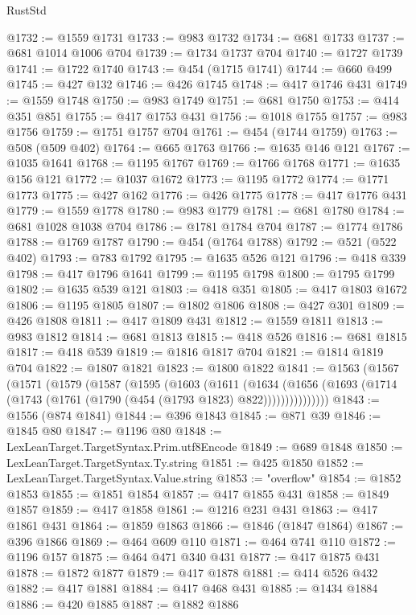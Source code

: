 \begin{lexlean}{RustStd}
\begin{coremodule}
@1732 := @1559 @1731
@1733 := @983 @1732
@1734 := @681 @1733
@1737 := @681 @1014 @1006 @704
@1739 := @1734 @1737 @704
@1740 := @1727 @1739
@1741 := @1722 @1740
@1743 := @454 (@1715 @1741)
@1744 := @660 @499
@1745 := @427 @132
@1746 := @426 @1745
@1748 := @417 @1746 @431
@1749 := @1559 @1748
@1750 := @983 @1749
@1751 := @681 @1750
@1753 := @414 @351 @851
@1755 := @417 @1753 @431
@1756 := @1018 @1755
@1757 := @983 @1756
@1759 := @1751 @1757 @704
@1761 := @454 (@1744 @1759)
@1763 := @508 (@509 @402)
@1764 := @665 @1763
@1766 := @1635 @146 @121
@1767 := @1035 @1641
@1768 := @1195 @1767
@1769 := @1766 @1768
@1771 := @1635 @156 @121
@1772 := @1037 @1672
@1773 := @1195 @1772
@1774 := @1771 @1773
@1775 := @427 @162
@1776 := @426 @1775
@1778 := @417 @1776 @431
@1779 := @1559 @1778
@1780 := @983 @1779
@1781 := @681 @1780
@1784 := @681 @1028 @1038 @704
@1786 := @1781 @1784 @704
@1787 := @1774 @1786
@1788 := @1769 @1787
@1790 := @454 (@1764 @1788)
@1792 := @521 (@522 @402)
@1793 := @783 @1792
@1795 := @1635 @526 @121
@1796 := @418 @339
@1798 := @417 @1796 @1641
@1799 := @1195 @1798
@1800 := @1795 @1799
@1802 := @1635 @539 @121
@1803 := @418 @351
@1805 := @417 @1803 @1672
@1806 := @1195 @1805
@1807 := @1802 @1806
@1808 := @427 @301
@1809 := @426 @1808
@1811 := @417 @1809 @431
@1812 := @1559 @1811
@1813 := @983 @1812
@1814 := @681 @1813
@1815 := @418 @526
@1816 := @681 @1815
@1817 := @418 @539
@1819 := @1816 @1817 @704
@1821 := @1814 @1819 @704
@1822 := @1807 @1821
@1823 := @1800 @1822
@1841 := @1563
    (@1567
      (@1571
        (@1579
          (@1587
            (@1595
              (@1603
                (@1611
                  (@1634
                    (@1656
                      (@1693 (@1714 (@1743 (@1761 (@1790 (@454 (@1793 @1823) @822)))))))))))))))
@1843 := @1556 (@874 @1841)
@1844 := @396 @1843
@1845 := @871 @39
@1846 := @1845 @80
@1847 := @1196 @80
@1848 := LexLeanTarget.TargetSyntax.Prim.utf8Encode
@1849 := @689 @1848
@1850 := LexLeanTarget.TargetSyntax.Ty.string
@1851 := @425 @1850
@1852 := LexLeanTarget.TargetSyntax.Value.string
@1853 := "overflow"
@1854 := @1852 @1853
@1855 := @1851 @1854
@1857 := @417 @1855 @431
@1858 := @1849 @1857
@1859 := @417 @1858
@1861 := @1216 @231 @431
@1863 := @417 @1861 @431
@1864 := @1859 @1863
@1866 := @1846 (@1847 @1864)
@1867 := @396 @1866
@1869 := @464 @609 @110
@1871 := @464 @741 @110
@1872 := @1196 @157
@1875 := @464 @471 @340 @431
@1877 := @417 @1875 @431
@1878 := @1872 @1877
@1879 := @417 @1878
@1881 := @414 @526 @432
@1882 := @417 @1881
@1884 := @417 @468 @431
@1885 := @1434 @1884
@1886 := @420 @1885
@1887 := @1882 @1886

\end{coremodule}
\end{lexlean}
